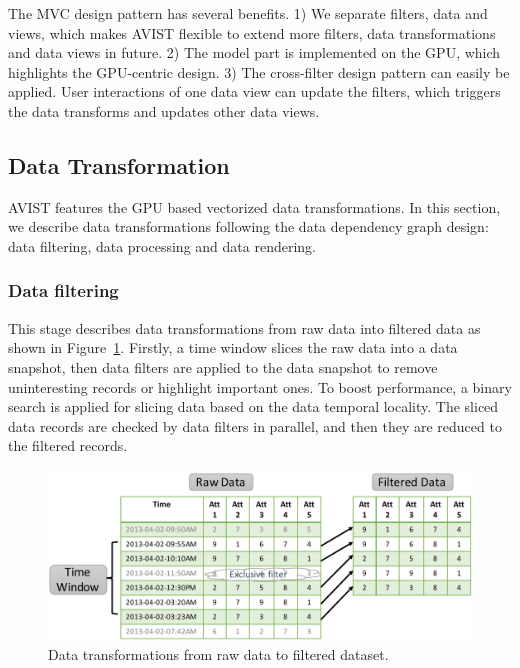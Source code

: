 The MVC design pattern has several benefits. 1) We separate filters, data and views, which makes AVIST flexible to extend more filters, data transformations and data views in future.  2) The model part is implemented on the GPU, which highlights the GPU-centric design. 3) The cross-filter design pattern can easily be  applied. User interactions of one data view can update the filters, which triggers the data transforms and updates other data views.


\subsection{Data Transformation}
AVIST features the GPU based vectorized data transformations. In this section, we describe data transformations following the data dependency graph design: data filtering, data processing and data rendering.

\subsubsection{Data filtering} 
This stage describes data transformations from raw data into filtered data as shown in Figure~\ref{fig:dataTran1}.
Firstly, a time window slices the raw data into a data snapshot, then data  filters are applied to the data snapshot to remove uninteresting records or highlight important ones. To boost performance, a binary search is applied for slicing data based on the data temporal locality.  The sliced data records are checked by data filters in parallel, and then they are reduced to the filtered records.   

\begin{figure}[htb]
	\centering
	\includegraphics[width=1.0\linewidth]{pic/trans.pdf}
	\parbox[t]{1.0\columnwidth}{\relax
	}
	\caption{\label{fig:dataTran1} Data transformations from raw data to filtered dataset.}
\end{figure} 




